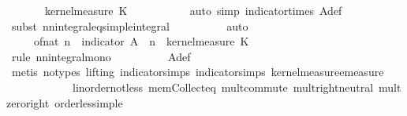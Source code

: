 \begin{isabellebody}
\ \ \ \ \ \ \ {\isasympartial}kernel{\isacharunderscore}{\kern0pt}measure\ K{\isacharunderscore}{\kern0pt}{}\ {\isasymomega}\isanewline
\ \ \ \ \ \ \ \ \isamarkupfalse%
\ {\isacharparenleft}{\kern0pt}auto\ simp{\isacharcolon}{\kern0pt}\ indicator{\isacharunderscore}{\kern0pt}times\ A{\isacharunderscore}{\kern0pt}def{\isacharparenright}{\kern0pt}\isanewline
\ \ \ \ \ \ \ \ \isamarkupfalse%
\ {\isacharparenleft}{\kern0pt}subst{\isacharparenleft}{\kern0pt}{}{\isacharparenright}{\kern0pt}\ nn{\isacharunderscore}{\kern0pt}integral{\isacharunderscore}{\kern0pt}eq{\isacharunderscore}{\kern0pt}simple{\isacharunderscore}{\kern0pt}integral{\isacharparenright}{\kern0pt}\isanewline
\ \ \ \ \ \ \ \ \isamarkupfalse%
\ auto\isanewline
\ \ \ \ \ \ \isamarkupfalse%
\ \isamarkupfalse%
\ {\isachardoublequoteopen}{\isachardot}{\kern0pt}{\isachardot}{\kern0pt}{\isachardot}{\kern0pt}\ {\isasymle}\ {\isasymintegral}\isactrlsup {\isacharplus}{\kern0pt}\ {\isasymomega}\ {\isacharparenleft}{\kern0pt}of{\isacharunderscore}{\kern0pt}nat\ n{\isacharparenright}{\kern0pt}\ {\isacharasterisk}{\kern0pt}\ indicator\ {\isacharparenleft}{\kern0pt}A\ {\isasymomega}\ n{\isacharparenright}{\kern0pt}\ {\isasymomega}\ {\isasympartial}kernel{\isacharunderscore}{\kern0pt}measure\ K{\isacharunderscore}{\kern0pt}{}\ {\isasymomega}\isanewline
\ \ \ \ \ \ \ \ \isamarkupfalse%
\ {\isacharparenleft}{\kern0pt}rule\ nn{\isacharunderscore}{\kern0pt}integral{\isacharunderscore}{\kern0pt}mono{\isacharparenright}{\kern0pt}\isanewline
\ \ \ \ \ \ \ \ \isamarkupfalse%
\ A{\isacharunderscore}{\kern0pt}def\isanewline
\ \ \ \ \ \ \ \ \isamarkupfalse%
\ {\isacharparenleft}{\kern0pt}metis\ {\isacharparenleft}{\kern0pt}no{\isacharunderscore}{\kern0pt}types{\isacharcomma}{\kern0pt}\ lifting{\isacharparenright}{\kern0pt}\ indicator{\isacharunderscore}{\kern0pt}simps{\isacharparenleft}{\kern0pt}{}{\isacharparenright}{\kern0pt}\ indicator{\isacharunderscore}{\kern0pt}simps{\isacharparenleft}{\kern0pt}{}{\isacharparenright}{\kern0pt}\ kernel{\isacharunderscore}{\kern0pt}measure{\isacharunderscore}{\kern0pt}emeasure\isanewline
\ \ \ \ \ \ \ \ \ \ \ \ linorder{\isacharunderscore}{\kern0pt}not{\isacharunderscore}{\kern0pt}less\ mem{\isacharunderscore}{\kern0pt}Collect{\isacharunderscore}{\kern0pt}eq\ mult{\isachardot}{\kern0pt}commute\ mult{\isachardot}{\kern0pt}right{\isacharunderscore}{\kern0pt}neutral\ mult{\isacharunderscore}{\kern0pt}zero{\isacharunderscore}{\kern0pt}right\ order{\isacharunderscore}{\kern0pt}less{\isacharunderscore}{\kern0pt}imp{\isacharunderscore}{\kern0pt}le{\isacharparenright}{\kern0pt}\isanewline

\end{isabellebody}
